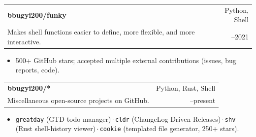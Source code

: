 \documentclass[letterpaper,10pt]{article}
\makeatletter
\newcommand{\projsubheading}[4]{%
  \par\addvspace{3pt}%
  \noindent
  \begin{tabular*}{\textwidth}{@{}l@{\extracolsep{\fill}}r@{}}
    {\bfseries\color{googleink}\fontsize{10.4pt}{12.4pt}\selectfont #1} &
    {\ttfamily\color{googleslate}\fontsize{8.6pt}{10.3pt}\selectfont #2} \\[0.5pt]
    {\color{googleink}\fontsize{9.9pt}{11.7pt}\selectfont #3} &
    {\color{googleslate}\fontsize{8.8pt}{10.5pt}\selectfont #4}
  \end{tabular*}\par\vspace{-3pt}
}
\makeatother
\begin{document}
\projsubheading{bbugyi200/funky}{Python, Shell}{Makes shell functions easier to define, more flexible, and more interactive.}{2017--2021}
\begin{itemize}
  \item 500+ GitHub stars; accepted multiple external contributions (issues, bug reports, code).
\end{itemize}

\projsubheading{bbugyi200/*}{Python, Rust, Shell}{Miscellaneous open-source projects on GitHub.}{2017--present}
\begin{itemize}
  \item \texttt{greatday} (GTD todo manager)\,$\cdot$\,\texttt{cldr} (ChangeLog Driven Releases)\,$\cdot$\,\texttt{shv} (Rust shell-history viewer)\,$\cdot$\,\texttt{cookie} (templated file generator, 250+ stars).
\end{itemize}
\end{document}
